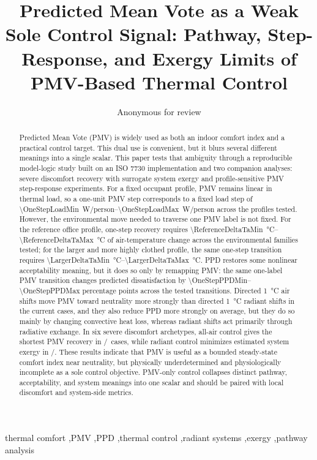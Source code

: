 \documentclass[preprint,authoryear,12pt]{elsarticle}
\begin{document}
\begin{frontmatter}

\title{Predicted Mean Vote as a Weak Sole Control Signal: Pathway, Step-Response, and Exergy Limits of PMV-Based Thermal Control}

\author{Anonymous for review}

\begin{abstract}
Predicted Mean Vote (PMV) is widely used as both an indoor comfort index and a practical control target. This dual use is convenient, but it blurs several different meanings into a single scalar. This paper tests that ambiguity through a reproducible model-logic study built on an ISO 7730 implementation and two companion analyses: severe discomfort recovery with surrogate system exergy and profile-sensitive PMV step-response experiments. For a fixed occupant profile, PMV remains linear in thermal load, so a one-unit PMV step corresponds to a fixed load step of \SIrange{\OneStepLoadMin}{\OneStepLoadMax}{W/person} across the profiles tested. However, the environmental move needed to traverse one PMV label is not fixed. For the reference office profile, one-step recovery requires \SIrange{\ReferenceDeltaTaMin}{\ReferenceDeltaTaMax}{\celsius} of air-temperature change across the environmental families tested; for the larger and more highly clothed profile, the same one-step transition requires \SIrange{\LargerDeltaTaMin}{\LargerDeltaTaMax}{\celsius}. PPD restores some nonlinear acceptability meaning, but it does so only by remapping PMV: the same one-label PMV transition changes predicted dissatisfaction by \numrange{\OneStepPPDMin}{\OneStepPPDMax} percentage points across the tested transitions. Directed \SI{1}{\celsius} air shifts move PMV toward neutrality more strongly than directed \SI{1}{\celsius} radiant shifts in the current cases, and they also reduce PPD more strongly on average, but they do so mainly by changing convective heat loss, whereas radiant shifts act primarily through radiative exchange. In six severe discomfort archetypes, all-air control gives the shortest PMV recovery in \AllAirControlWins/\ScenarioCount\ cases, while radiant control minimizes estimated system exergy in \RadiantExergyWins/\ScenarioCount. These results indicate that PMV is useful as a bounded steady-state comfort index near neutrality, but physically underdetermined and physiologically incomplete as a sole control objective. PMV-only control collapses distinct pathway, acceptability, and system meanings into one scalar and should be paired with local discomfort and system-side metrics.
\end{abstract}

\begin{keyword}
thermal comfort \sep PMV \sep PPD \sep thermal control \sep radiant systems \sep exergy \sep pathway analysis
\end{keyword}

\end{frontmatter}
\end{document}
